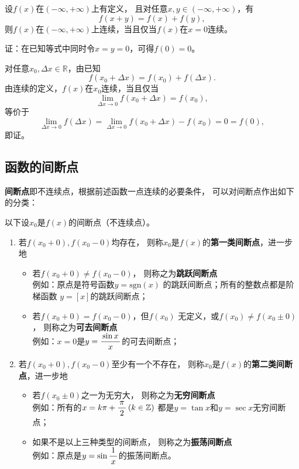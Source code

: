\bs
\egz 
设$f(x)$在$(-\infty,+\infty)$上有定义，
且对任意$x,y\in (-\infty,+\infty)$，有
$$f(x+y)=f(x)+f(y),$$
则$f(x)$在$(-\infty,+\infty)$上连续，当且仅当$f(x)$在$x=0$连续。

证：在已知等式中同时令$x=y=0$，可得$f(0)=0$。

对任意$x_0,\Delta x\in\mathbb{R}$，由已知
$$f(x_0+\Delta x)=f(x_0)+f(\Delta x).$$
由连续的定义，$f(x)$在$x_0$连续，当且仅当
$$\lim\limits_{\Delta x\to 0}f(x_0+\Delta x)=f(x_0),$$
等价于
$$\lim\limits_{\Delta x\to 0}f(\Delta x)
=\lim\limits_{\Delta x\to 0}f(x_0+\Delta x)-f(x_0)=0=f(0),$$
即证。\fin


\subsection{函数的间断点}

{\bf 间断点}即不连续点，根据前述函数一点连续的必要条件，
可以对间断点作出如下的分类：

\begin{thx}
	以下设$x_0$是$f(x)$的间断点（不连续点）。
	\begin{enumerate}[(1)]
		\item 若$f(x_0+0),f(x_0-0)$均存在，
		则称$x_0$是$f(x)$的{\bf 第一类间断点}，进一步地
		\begin{itemize}
			\item 若$f(x_0+0)\ne f(x_0-0)$，
			则称之为{\bf 跳跃间断点}\\
			\quad 例如：原点是符号函数$y=\mathrm{sgn}(x)$
			的跳跃间断点；所有的整数点都是阶梯函数
			$y=[x]$的跳跃间断点；
			\item 若$f(x_0+0)=f(x_0-0)$，但$f(x_0)$
			无定义，或$f(x_0)\ne f(x_0\pm0)$，
			则称之为{\bf 可去间断点}\\
			\quad 例如：$x=0$是$y=\displaystyle\frac{\,{\sin x}\,}{\,{x}\,}$的可去间断点；
		\end{itemize}
		\item 若$f(x_0+0),f(x_0-0)$至少有一个不存在，
		则称$x_0$是$f(x)$的{\bf 第二类间断点}，进一步地
		\begin{itemize}
			\item 若$f(x_0\pm0)$之一为无穷大，
			则称之为{\bf 无穷间断点}\\
			\quad 例如：所有的$x=k\pi+\displaystyle\frac{\,{\pi}\,}{\,{2}\,}\,(k\in\mathbb{Z})$
			都是$y=\tan x$和$y=\sec x$无穷间断点；
			\item 如果不是以上三种类型的间断点，
			则称之为{\bf 振荡间断点}\\
			\quad 例如：原点是$y=\sin\displaystyle\frac{\,{1}\,}{\,{x}\,}$的振荡间断点。
		\end{itemize}
	\end{enumerate}
\end{thx}

